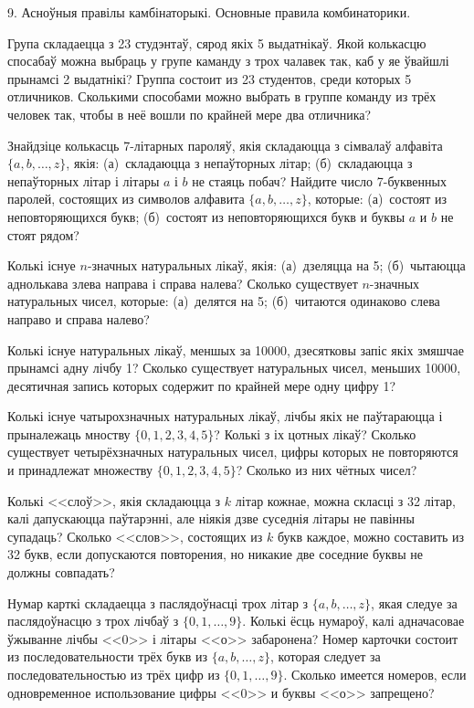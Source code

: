 



\biLangHeader
{9. Асноўныя правілы камбінаторыкі.}
{Основные правила комбинаторики.}

\begin{problemList}
	
\problemItemSimple
{Група складаецца з 23 студэнтаў, сярод якіх 5 выдатнікаў. Якой колькасцю спосабаў можна выбраць у групе каманду з трох чалавек так, каб у яе ўвайшлі прынамсі 2 выдатнікі?}
{Группа состоит из 23 студентов, среди которых 5 отличников. Сколькими способами можно выбрать в группе команду из трёх человек так, чтобы в неё вошли по крайней мере два отличника?}	

\problemItemSimple
{Знайдзіце колькасць 7-літарных пароляў, якія складаюцца з сімвалаў алфавіта $\{a, b, \dots, z \}$, якія: (а)~складаюцца з непаўторных літар; (б)~складаюцца з непаўторных літар і літары $a$ і $b$ не стаяць побач?}
{Найдите число 7-буквенных паролей, состоящих из символов алфавита $\{a, b, \dots, z \}$, которые: (а)~состоят из неповторяющихся букв; (б)~состоят из неповторяющихся букв и буквы $a$ и $b$ не стоят рядом?}

\problemItemSimple
{Колькі існуе $n$-значных натуральных лікаў, якія: (а)~дзеляцца на 5; (б)~чытаюцца аднолькава злева направа і справа налева?}
{Сколько существует $n$-значных натуральных чисел, которые: (а)~делятся на 5; (б)~читаются одинаково слева направо и справа налево?}

\problemItemSimple
{Колькі існуе натуральных лікаў, меншых за 10000, дзесятковы запіс якіх змяшчае прынамсі адну лічбу 1?}
{Сколько существует натуральных чисел, меньших 10000, десятичная запись которых содержит по крайней мере одну цифру 1?}

\problemItemSimple
{Колькі існуе чатырохзначных натуральных лікаў, лічбы якіх не паўтараюцца і прыналежаць мноству $\{0, 1, 2, 3, 4, 5\}$? Колькі з іх цотных лікаў?}
{Сколько существует четырёхзначных натуральных чисел, цифры которых не повторяются и принадлежат множеству $\{0, 1, 2, 3, 4, 5\}$? Сколько из них чётных чисел?}

\problemItemSimple
{Колькі <<слоў>>, якія складаюцца з $k$ літар кожнае, можна скласці з 32 літар, калі дапускаюцца паўтарэнні, але ніякія дзве суседнія літары не павінны супадаць?}
{Сколько <<слов>>, состоящих из $k$ букв каждое, можно составить из 32 букв, если допускаются повторения, но никакие две соседние буквы не должны совпадать?}

\problemItemSimple
{Нумар карткі складаецца з паслядоўнасці трох літар з  $\{a, b, \dots, z \}$, якая следуе за паслядоўнасцю з трох лічбаў з $\{0, 1, \dots, 9 \}$. Колькі ёсць нумароў, калі адначасовае ўжыванне лічбы <<0>> і літары <<о>> забаронена?}
{Номер карточки состоит из последовательности трёх букв из $\{a, b, \dots, z \}$, которая следует за последовательностью из трёх цифр из $\{0, 1, \dots, 9 \}$. Сколько имеется номеров, если одновременное использование цифры <<0>> и буквы <<о>> запрещено?}


\end{problemList}
